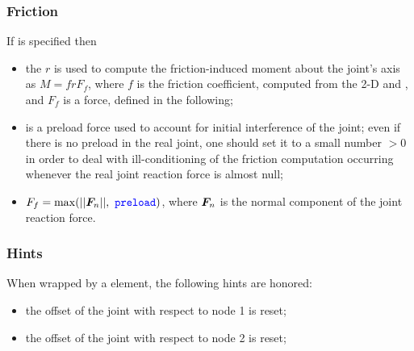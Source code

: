 \subsubsection{Friction}
If  is specified then
\begin{itemize}
\item the  $r$ is used to compute the friction-induced moment about the joint's axis as $M = frF_f$, where $f$ is the friction coefficient, computed from the 2-D  and , and $F_f$ is a force, defined in the following;
\item {} is a preload force used to account for initial interference of the joint; even if there is no preload
in the real joint, one should set it to a small number $> 0$  in order to deal with ill-conditioning of the friction computation occurring whenever the real joint reaction force is almost null;
\item $F_f=\max(||\T{F}_n||,\ \nt{preload})$, where $\boldsymbol{F}_n$ is the normal component of the joint reaction force. 
\end{itemize}

\subsubsection{Hints}
When wrapped by a  element, the following hints are honored:
\begin{itemize}
\item {} the offset of the joint
with respect to node 1 is reset;
\item {} the offset of the joint
with respect to node 2 is reset;
\end{itemize}
